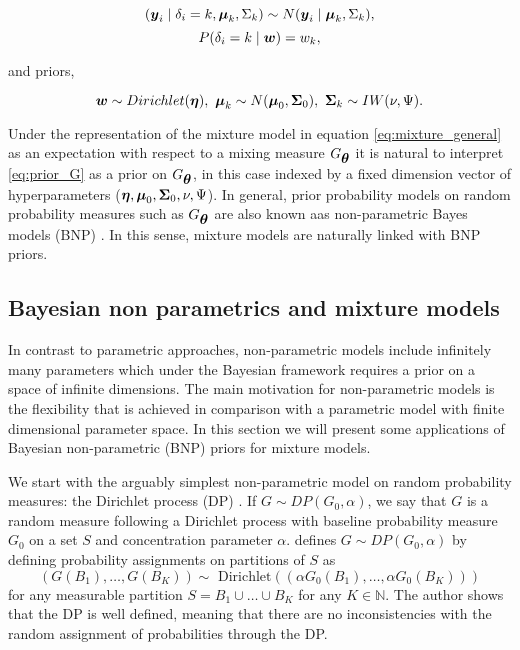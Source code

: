 $$(\mbox{\boldmath $y$}_i \mid \delta_i = k, \mbox{\boldmath $\mu$}_k, \Sigma_k) \sim N(\mbox{\boldmath $y$}_i\mid \mbox{\boldmath $\mu$}_k, \Sigma_k), $$
$$P(\delta_i = k \mid \mbox{\boldmath $w$}) = w_k,$$

\noindent and priors,

\begin{equation}
\mbox{\boldmath $w$} \sim Dirichlet(\mbox{\boldmath $\eta$}), \ \mbox{\boldmath $\mu$}_k \sim N(\mbox{\boldmath $\mu$}_0, \mbox{\boldmath $\Sigma$}_0), \ \mbox{\boldmath $\Sigma$}_k \sim IW(\nu, \Psi).
\label{eq:prior_G}
\end{equation}

Under the representation of the mixture model in equation \eqref{eq:mixture_general} as an expectation with respect to a mixing measure $G_{\mbox{\boldmath $\theta$}}$ it is natural to interpret \eqref{eq:prior_G} as a prior on $G_{\mbox{\boldmath $\theta$}}$, in this case indexed by a fixed dimension vector of hyperparameters ($\mbox{\boldmath $\eta$}, \mbox{\boldmath $\mu$}_0, \mbox{\boldmath $\Sigma$}_0, \nu, \Psi$). In general, prior probability models on random probability measures such as $G_{\mbox{\boldmath $\theta$}}$ are also known aas non-parametric Bayes models (BNP) \citep{BNP_Ferguson}. In this sense, mixture models are naturally linked with BNP priors.


\subsection{Bayesian non parametrics and mixture models}

In contrast to parametric approaches, non-parametric models include infinitely many parameters which under the Bayesian framework requires a prior on a space of infinite dimensions. The main motivation for non-parametric models is the flexibility that is achieved in comparison with a parametric model with finite dimensional parameter space. In this section we will present some applications of Bayesian non-parametric (BNP) priors for mixture models.

We start with the arguably simplest non-parametric model on random probability measures: the Dirichlet process (DP) \citep{ferguson1973}. If $G \sim DP(G_0, \alpha)$, we say that $G$ is a random measure following a Dirichlet process with baseline probability measure $G_0$ on a set $S$ and concentration parameter $\alpha$. \cite{ferguson1973} defines  $G \sim DP(G_0, \alpha)$  by defining probability assignments on partitions of $S$ as 
$$(G(B_1), \ldots, G(B_K) ) \sim \mbox{ Dirichlet}( (\alpha G_0(B_1), \ldots, \alpha G_0(B_K)) )$$
for any measurable partition $S = B_1 \cup \ldots \cup B_K$ for any $K\in \mathbb{N}$. The author shows that the DP is well defined, meaning that there are no inconsistencies with the random assignment of probabilities through the DP. 

